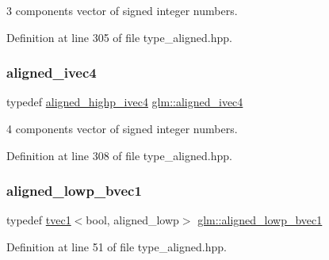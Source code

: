 3 components vector of signed integer numbers. 



Definition at line 305 of file type\+\_\+aligned.\+hpp.

\mbox{\label{group__gtc__type__aligned_gaa33169a30c7d22a8648f20b4534f635f}} 
\subsubsection{\texorpdfstring{aligned\_ivec4}{aligned\_ivec4}}
{\footnotesize\ttfamily typedef \mbox{\hyperlink{group__gtc__type__aligned_ga4dcc1c7c3d087b9f61635069fc97671b}{aligned\+\_\+highp\+\_\+ivec4}} \mbox{\hyperlink{group__gtc__type__aligned_gaa33169a30c7d22a8648f20b4534f635f}{glm\+::aligned\+\_\+ivec4}}}



4 components vector of signed integer numbers. 



Definition at line 308 of file type\+\_\+aligned.\+hpp.

\mbox{\label{group__gtc__type__aligned_ga14a75d34e21dea21ebc963dbb7596a02}} 
\subsubsection{\texorpdfstring{aligned\_lowp\_bvec1}{aligned\_lowp\_bvec1}}
{\footnotesize\ttfamily typedef \mbox{\hyperlink{structglm_1_1tvec1}{tvec1}}$<$bool, aligned\+\_\+lowp$>$ \mbox{\hyperlink{group__gtc__type__aligned_ga14a75d34e21dea21ebc963dbb7596a02}{glm\+::aligned\+\_\+lowp\+\_\+bvec1}}}



Definition at line 51 of file type\+\_\+aligned.\+hpp.

\mbox{\label{group__gtc__type__aligned_gab9dc3bd3ccc5a3a8c30a4bd4b6927782}} 
